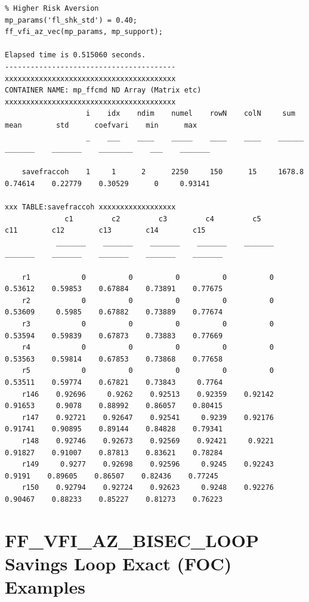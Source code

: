 \documentclass[
]{book}
\begin{document}
\begin{verbatim}
% Higher Risk Aversion
mp_params('fl_shk_std') = 0.40;
ff_vfi_az_vec(mp_params, mp_support);

Elapsed time is 0.515060 seconds.
----------------------------------------
xxxxxxxxxxxxxxxxxxxxxxxxxxxxxxxxxxxxxxxx
CONTAINER NAME: mp_ffcmd ND Array (Matrix etc)
xxxxxxxxxxxxxxxxxxxxxxxxxxxxxxxxxxxxxxxx
                   i    idx    ndim    numel    rowN    colN     sum       mean        std      coefvari    min      max  
                   _    ___    ____    _____    ____    ____    ______    _______    _______    ________    ___    _______

    savefraccoh    1     1      2      2250     150      15     1678.8    0.74614    0.22779    0.30529      0     0.93141

xxx TABLE:savefraccoh xxxxxxxxxxxxxxxxxx
              c1         c2         c3         c4         c5         c11        c12        c13        c14        c15  
            _______    _______    _______    _______    _______    _______    _______    _______    _______    _______

    r1            0          0          0          0          0    0.53612    0.59853    0.67884    0.73891    0.77675
    r2            0          0          0          0          0    0.53609     0.5985    0.67882    0.73889    0.77674
    r3            0          0          0          0          0    0.53594    0.59839    0.67873    0.73883    0.77669
    r4            0          0          0          0          0    0.53563    0.59814    0.67853    0.73868    0.77658
    r5            0          0          0          0          0    0.53511    0.59774    0.67821    0.73843     0.7764
    r146    0.92696     0.9262    0.92513    0.92359    0.92142    0.91653     0.9078    0.88992    0.86057    0.80415
    r147    0.92721    0.92647    0.92541     0.9239    0.92176    0.91741    0.90895    0.89144    0.84828    0.79341
    r148    0.92746    0.92673    0.92569    0.92421     0.9221    0.91827    0.91007    0.87813    0.83621    0.78284
    r149     0.9277    0.92698    0.92596     0.9245    0.92243     0.9191    0.89605    0.86507    0.82436    0.77245
    r150    0.92794    0.92724    0.92623     0.9248    0.92276    0.90467    0.88233    0.85227    0.81273    0.76223
\end{verbatim}

\hypertarget{ff_vfi_az_bisec_loop-savings-loop-exact-foc-examples}{%
\section{FF\_VFI\_AZ\_BISEC\_LOOP Savings Loop Exact (FOC) Examples}\label{ff_vfi_az_bisec_loop-savings-loop-exact-foc-examples}}
\end{document}
